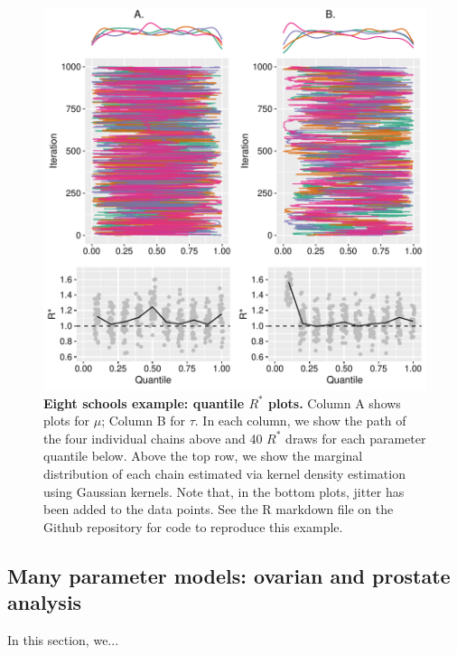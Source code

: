 \documentclass{article}
\begin{document}
\begin{figure}[!htb]
	\centerline{\includegraphics[width=1.0\textwidth]{../output/eight_schools_r_star_quantiles.pdf}}
	\caption{\textbf{Eight schools example: quantile $R^*$ plots.} Column A shows plots for $\mu$; Column B for $\tau$. In each column, we show the path of the four individual chains above and 40 $R^*$ draws for each parameter quantile below. Above the top row, we show the marginal distribution of each chain estimated via kernel density estimation using Gaussian kernels. Note that, in the bottom plots, jitter has been added to the data points. See the R markdown file on the Github repository for code to reproduce this example.}
	\label{fig:eight_schools_r_star_quantiles}
\end{figure}

\subsection{Many parameter models: ovarian and prostate analysis}
In this section, we...
\end{document}
